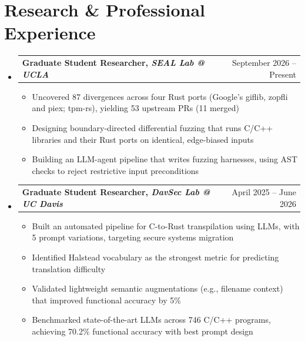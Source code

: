 \documentclass[letterpaper,10pt]{article}
\makeatletter
\newcommand{\resumeItem}[1]{\item\small{#1} \vspace{-3pt}}
\newcommand{\resumeSubheadingSmall}[2]{%
  \vspace{-1pt}\item
  \begin{tabular*}{0.97\textwidth}[t]{l@{\extracolsep{\fill}}r}
    \textbf{#1} & #2 \\
  \end{tabular*}\vspace{-7pt}}
\newcommand{\resumeSubHeadingList}{\begin{itemize}[leftmargin=0.15in, label={}, labelsep=0.15in]}
\newcommand{\resumeJustifiedList}{\begin{itemize}[leftmargin=0.3in, label=\textbullet, labelsep=0.1in]}
\newcommand{\resumeSubHeadingListEnd}{\end{itemize}}
\makeatother
\begin{document}
\section{Research \& Professional Experience}
{\normalsize
\resumeSubHeadingList
  \resumeSubheadingSmall{Graduate Student Researcher, \textit{SEAL Lab @ UCLA}}{September 2026 -- Present}
  \resumeJustifiedList
    \resumeItem{Uncovered 87 divergences across four Rust ports (Google's giflib, zopfli and piex; tpm-rs), yielding 53 upstream PRs (11 merged)}
    \resumeItem{Designing boundary-directed differential fuzzing that runs C/C++ libraries and their Rust ports on identical, edge-biased inputs}
    \resumeItem{Building an LLM-agent pipeline that writes fuzzing harnesses, using AST checks to reject restrictive input preconditions}
  \end{itemize}
  \resumeSubheadingSmall{Graduate Student Researcher, \textit{DavSec Lab @ UC Davis}}{April 2025 -- June 2026}
  \resumeJustifiedList
    \resumeItem{Built an automated pipeline for C-to-Rust transpilation using LLMs, with 5 prompt variations, targeting secure systems migration}
    \resumeItem{Identified Halstead vocabulary as the strongest metric for predicting translation difficulty}
    \resumeItem{Validated lightweight semantic augmentations (e.g., filename context) that improved functional accuracy by 5\%}
    \resumeItem{Benchmarked state-of-the-art LLMs across 746 C/C++ programs, achieving 70.2\% functional accuracy with best prompt design}
  \end{itemize}
\resumeSubHeadingListEnd
}
\end{document}
